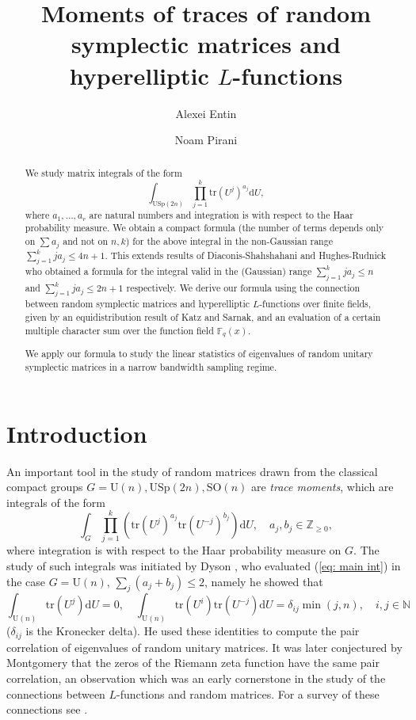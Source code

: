 \documentclass[alphabetic, 
        colorlinks,
        linkcolor=red,  citecolor=blue,
        backref
]{amsart}
\author{Alexei Entin }
\author{Noam Pirani}
\title{Moments of traces of random symplectic matrices and hyperelliptic $L$-functions}
\date{}
\numberwithin{equation}{section}
\theoremstyle{definition}
\newcommand{\N}{{\mathbb N}}
\newcommand{\Z}{{\mathbb Z}}
\newcommand{\USp}{{\mathrm{USp}}}
\newcommand{\U}{{\mathrm{U}}}
\newcommand{\SO}{{\mathrm{SO}}}
\newcommand{\tr}{{\mathrm{tr}}}
\newcommand{\F}{\mathbb{F}}
\begin{document}
\begin{abstract}
    We study matrix integrals of the form
    $$\int_{\USp(2n)}\prod_{j=1}^k\tr(U^j)^{a_j}\mathrm d U,$$
    where $a_1,\ldots,a_r$ are natural numbers and integration is with respect to the Haar probability measure. We obtain a compact formula (the number of terms depends only on $\sum a_j$ and not on $n,k$) for the above integral in the non-Gaussian range $\sum_{j=1}^kja_j\le 4n+1$. This extends results of Diaconis-Shahshahani and Hughes-Rudnick who obtained a formula for the integral valid in the (Gaussian) range $\sum_{j=1}^kja_j\le n$ and $\sum_{j=1}^kja_j\le 2n+1$ respectively. We derive our formula using the connection between random symplectic matrices and hyperelliptic $L$-functions over finite fields, given by an equidistribution result of Katz and Sarnak, and an evaluation of a certain multiple character sum over the function field $\F_q(x)$.

    We apply our formula to study the linear statistics of eigenvalues of random unitary symplectic matrices in a narrow bandwidth sampling regime.
\end{abstract}

\maketitle

\section{Introduction}

An important tool in the study of random matrices drawn from the classical compact groups $G=\U(n),\USp(2n),\SO(n)$ are \emph{trace moments}, which are integrals of the form
\begin{equation}\label{eq: main int}\int_G\prod_{j=1}^k\left(\tr(U^j)^{a_j}\tr(U^{-j})^{b_j}\right)\mathrm dU,\quad a_j,b_j\in\Z_{\ge 0},\end{equation} where integration is with respect to the Haar probability measure on $G$. The study of such integrals was initiated by Dyson \cite{Dys62}, who evaluated (\ref{eq: main int}) in the case $G=\U(n),\,\sum_j(a_j+b_j)\le 2$, namely he showed that
$$\int_{\U(n)}\tr(U^j)\mathrm dU=0,\quad\int_{\U(n)}\tr(U^i)\tr(U^{-j})\mathrm dU=\delta_{ij}\min(j,n),\quad i,j\in\N$$
($\delta_{ij}$ is the Kronecker delta). He used these identities to compute the pair correlation of eigenvalues of random unitary matrices. It was later conjectured by Montgomery \cite{Mon73} that the zeros of the Riemann zeta function have the same pair correlation, an observation which was an early cornerstone in the study of the connections between $L$-functions and random matrices. For a survey of these connections see \cite{KaSa99a}.
\end{document}
